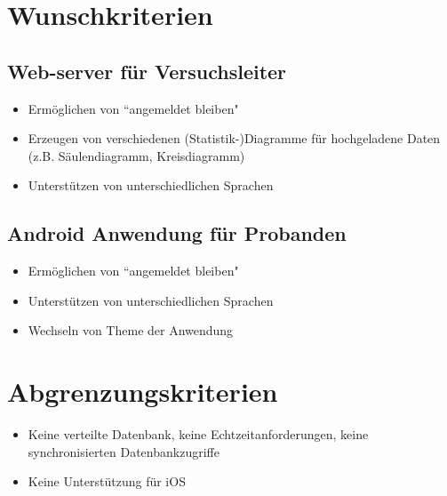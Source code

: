 \documentclass[a4paper]{scrreprt}
\begin{document}
        \section{Wunschkriterien}
            \vspace*{0.3cm}

            \subsection{Web-server f\"ur Versuchsleiter}
                \begin{itemize}
                    \item Erm\"oglichen von ``angemeldet bleiben"
                    \item Erzeugen von verschiedenen (Statistik-)Diagramme f\"ur hochgeladene Daten (z.B. S\"aulendiagramm, Kreisdiagramm)
                    \item Unterst\"utzen von unterschiedlichen Sprachen

                \end{itemize}

            \subsection{Android Anwendung f\"ur Probanden}
                \begin{itemize}
                    \item Erm\"oglichen von ``angemeldet bleiben"
                    \item Unterst\"utzen von unterschiedlichen Sprachen
                    \item Wechseln von Theme der Anwendung
                \end{itemize}
                \vspace*{0.5cm}


        \section{Abgrenzungskriterien}
            \begin{itemize}
                \item Keine verteilte Datenbank, keine Echtzeitanforderungen, keine synchronisierten Datenbankzugriffe
                \item Keine Unterst\"utzung f\"ur iOS
            \end{itemize}
\end{document}
